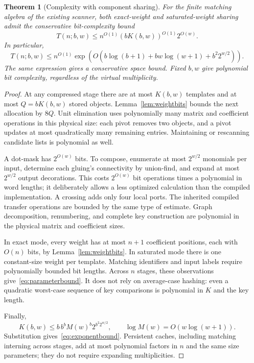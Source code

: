 \documentclass[11pt,letterpaper]{article}
\newtheorem{theorem}{Theorem}[section]
\begin{document}
\begin{theorem}[Complexity with component sharing]\label{thm:complexity}
For the finite matching algebra of the existing scanner, both exact-weight
and saturated-weight sharing admit the conservative bit-complexity bound
\begin{equation}\label{eq:parameterbound}
 T(n;b,w)\le n^{O(1)}(bK(b,w))^{O(1)}2^{O(w)}.
\end{equation}
In particular,
\begin{equation}\label{eq:exponentbound}
 T(n;b,w)\le n^{O(1)}
 \exp\!\left(O\!\left(b\log(b+1)+bw\log(w+1)+b^2 2^{w/2}\right)\right).
\end{equation}
The same expression gives a conservative space bound. Fixed $b,w$ give
polynomial bit complexity, regardless of the virtual multiplicity.
\end{theorem}
\begin{proof}
At any compressed stage there are at most $K(b,w)$ templates and at most
$Q=bK(b,w)$ stored objects. Lemma~\ref{lem:weightbits} bounds the next
allocation by $8Q$. Unit elimination uses polynomially many matrix and
coefficient operations in this physical size: each pivot removes two
objects, and a pivot updates at most quadratically many remaining entries.
Maintaining or rescanning candidate lists is polynomial as well.

A dot-mask has $2^{O(w)}$ bits. To compose, enumerate at most $2^{w/2}$ monomials per input, determine
each gluing's connectivity by union-find, and expand at most $2^{w/2}$
output decorations. This costs $2^{O(w)}$ bit operations times a polynomial
in word lengths; it deliberately allows a less optimized calculation
than the compiled implementation. A crossing adds only four local ports.
The inherited compiled transfer operations are bounded by the same type of
estimate. Graph decomposition, renumbering, and complete key construction
are polynomial in the physical matrix and coefficient sizes.

In exact mode, every weight has at most $n+1$ coefficient positions, each
with $O(n)$ bits, by Lemma~\ref{lem:weightbits}. In saturated mode there is
one constant-size weight per template. Matching identifiers and input
labels require polynomially bounded bit lengths. Across $n$ stages, these
observations give~\eqref{eq:parameterbound}. It does not rely on
average-case hashing: even a quadratic worst-case sequence of key
comparisons is polynomial in $K$ and the key length.

Finally,
\[
 K(b,w)\le b\,b^b M(w)^b2^{b^2 2^{w/2}},\qquad
 \log M(w)=O(w\log(w+1)).
\]
Substitution gives~\eqref{eq:exponentbound}. Persistent caches, including
matching interning across stages, add at most polynomial factors in $n$
and the same size parameters; they do not require expanding multiplicities.
\end{proof}
\end{document}
